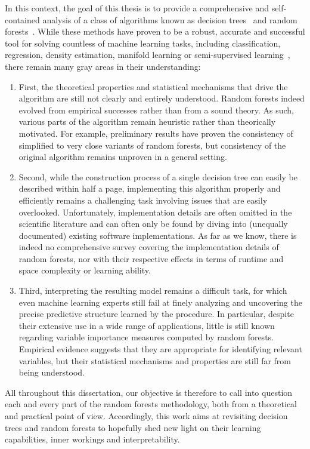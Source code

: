 In this context, the goal of this thesis is to provide a comprehensive and
self-contained analysis of a class of algorithms known as decision
trees~\citep{breiman:1984} and random forests~\citep{breiman:2001}. While these
methods have proven to be a robust, accurate and successful tool for solving
countless of machine learning tasks, including classification, regression,
density estimation, manifold learning or semi-supervised
learning~\citep{criminisi:2013}, there remain many gray areas in their
understanding:
\begin{enumerate}
\item First, the theoretical properties and statistical mechanisms that drive
the algorithm are still not clearly and entirely understood. Random forests
indeed evolved from empirical successes rather than from a sound
theory. As such, various parts of the algorithm remain heuristic rather than
theorically motivated. For example, preliminary
results have proven the consistency of simplified to very close variants of
random forests, but consistency of the original algorithm remains unproven
in a general setting.
\item Second, while the construction process of a single decision tree can
easily be described within half a page, implementing this algorithm properly
and efficiently remains a challenging task involving issues that are easily
overlooked. Unfortunately, implementation details are often omitted in the
scientific literature and can often only be found by diving into
(unequally documented) existing software implementations. As far as we know,
there is indeed no comprehensive survey covering the implementation details of
random forests, nor with their respective effects in terms of runtime and space
complexity or learning ability.
\item Third, interpreting the resulting model remains a difficult task,
for which even machine learning experts still fail at finely analyzing and
uncovering the precise predictive structure learned by the procedure.
In particular, despite their extensive use in a wide range of applications, little
is still known regarding variable importance measures computed by random forests.
Empirical evidence suggests that they are appropriate for identifying
relevant variables, but their statistical mechanisms and properties are
still far from being understood.
\end{enumerate}
All throughout this dissertation, our objective is therefore to call into
question each and every part of the random forests methodology,  both from a
theoretical and practical point of view. Accordingly, this work aims at
revisiting decision trees and random forests to hopefully shed new light on
their learning capabilities, inner workings and interpretability.

